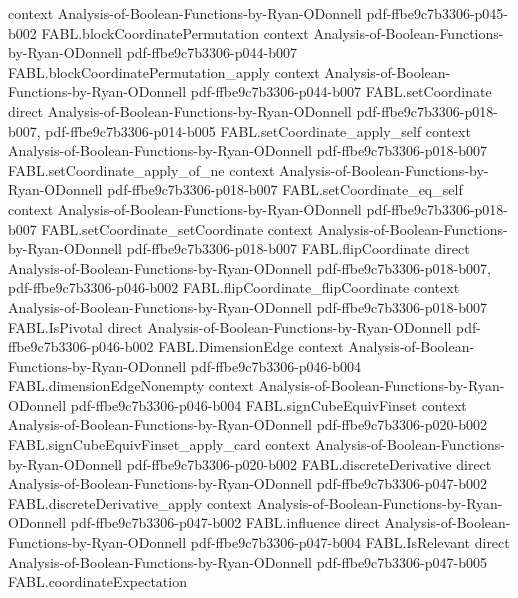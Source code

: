 \begin{theorem}
  {context}
  {Analysis-of-Boolean-Functions-by-Ryan-ODonnell}
  {pdf-ffbe9c7b3306-p045-b002}
\proofstep
  {FABL.blockCoordinatePermutation}
  {context}
  {Analysis-of-Boolean-Functions-by-Ryan-ODonnell}
  {pdf-ffbe9c7b3306-p044-b007}
\proofstep
  {FABL.blockCoordinatePermutation_apply}
  {context}
  {Analysis-of-Boolean-Functions-by-Ryan-ODonnell}
  {pdf-ffbe9c7b3306-p044-b007}
\proofstep
  {FABL.setCoordinate}
  {direct}
  {Analysis-of-Boolean-Functions-by-Ryan-ODonnell}
  {pdf-ffbe9c7b3306-p018-b007,
    pdf-ffbe9c7b3306-p014-b005}
\proofstep
  {FABL.setCoordinate_apply_self}
  {context}
  {Analysis-of-Boolean-Functions-by-Ryan-ODonnell}
  {pdf-ffbe9c7b3306-p018-b007}
\proofstep
  {FABL.setCoordinate_apply_of_ne}
  {context}
  {Analysis-of-Boolean-Functions-by-Ryan-ODonnell}
  {pdf-ffbe9c7b3306-p018-b007}
\proofstep
  {FABL.setCoordinate_eq_self}
  {context}
  {Analysis-of-Boolean-Functions-by-Ryan-ODonnell}
  {pdf-ffbe9c7b3306-p018-b007}
\proofstep
  {FABL.setCoordinate_setCoordinate}
  {context}
  {Analysis-of-Boolean-Functions-by-Ryan-ODonnell}
  {pdf-ffbe9c7b3306-p018-b007}
\proofstep
  {FABL.flipCoordinate}
  {direct}
  {Analysis-of-Boolean-Functions-by-Ryan-ODonnell}
  {pdf-ffbe9c7b3306-p018-b007,
    pdf-ffbe9c7b3306-p046-b002}
\proofstep
  {FABL.flipCoordinate_flipCoordinate}
  {context}
  {Analysis-of-Boolean-Functions-by-Ryan-ODonnell}
  {pdf-ffbe9c7b3306-p018-b007}
\proofstep
  {FABL.IsPivotal}
  {direct}
  {Analysis-of-Boolean-Functions-by-Ryan-ODonnell}
  {pdf-ffbe9c7b3306-p046-b002}
\proofstep
  {FABL.DimensionEdge}
  {context}
  {Analysis-of-Boolean-Functions-by-Ryan-ODonnell}
  {pdf-ffbe9c7b3306-p046-b004}
\proofstep
  {FABL.dimensionEdgeNonempty}
  {context}
  {Analysis-of-Boolean-Functions-by-Ryan-ODonnell}
  {pdf-ffbe9c7b3306-p046-b004}
\proofstep
  {FABL.signCubeEquivFinset}
  {context}
  {Analysis-of-Boolean-Functions-by-Ryan-ODonnell}
  {pdf-ffbe9c7b3306-p020-b002}
\proofstep
  {FABL.signCubeEquivFinset_apply_card}
  {context}
  {Analysis-of-Boolean-Functions-by-Ryan-ODonnell}
  {pdf-ffbe9c7b3306-p020-b002}
\proofstep
  {FABL.discreteDerivative}
  {direct}
  {Analysis-of-Boolean-Functions-by-Ryan-ODonnell}
  {pdf-ffbe9c7b3306-p047-b002}
\proofstep
  {FABL.discreteDerivative_apply}
  {context}
  {Analysis-of-Boolean-Functions-by-Ryan-ODonnell}
  {pdf-ffbe9c7b3306-p047-b002}
\proofstep
  {FABL.influence}
  {direct}
  {Analysis-of-Boolean-Functions-by-Ryan-ODonnell}
  {pdf-ffbe9c7b3306-p047-b004}
\proofstep
  {FABL.IsRelevant}
  {direct}
  {Analysis-of-Boolean-Functions-by-Ryan-ODonnell}
  {pdf-ffbe9c7b3306-p047-b005}
\proofstep
  {FABL.coordinateExpectation}

\end{theorem}
